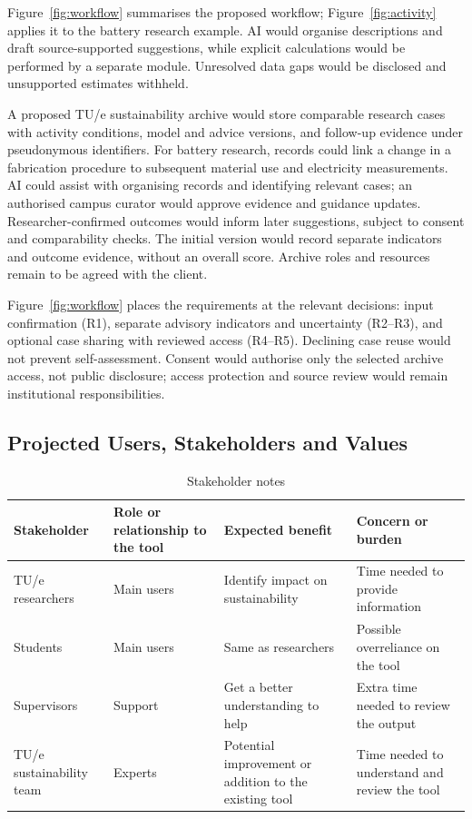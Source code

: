 \documentclass[11pt,a4paper]{article}
\begin{document}
Figure~\ref{fig:workflow} summarises the proposed workflow; Figure~\ref{fig:activity} applies it to the battery research example. AI would organise descriptions and draft source-supported suggestions, while explicit calculations would be performed by a separate module. Unresolved data gaps would be disclosed and unsupported estimates withheld.

A proposed TU/e sustainability archive would store comparable research cases with activity conditions, model and advice versions, and follow-up evidence under pseudonymous identifiers. For battery research, records could link a change in a fabrication procedure to subsequent material use and electricity measurements. AI could assist with organising records and identifying relevant cases; an authorised campus curator would approve evidence and guidance updates. Researcher-confirmed outcomes would inform later suggestions, subject to consent and comparability checks. The initial version would record separate indicators and outcome evidence, without an overall score. Archive roles and resources remain to be agreed with the client.

Figure~\ref{fig:workflow} places the requirements at the relevant decisions: input confirmation (R1), separate advisory indicators and uncertainty (R2--R3), and optional case sharing with reviewed access (R4--R5). Declining case reuse would not prevent self-assessment. Consent would authorise only the selected archive access, not public disclosure; access protection and source review would remain institutional responsibilities.




\FloatBarrier
\subsection{Projected Users, Stakeholders and Values}
\begin{table}[ht]
\centering
\begin{tabularx}{\textwidth}{|X|X|X|X|}
\hline
\textbf{Stakeholder} & \textbf{Role or relationship to the tool} & 
\textbf{Expected benefit} & \textbf{Concern or burden} \\
\hline

TU/e researchers &
Main users &
Identify impact on sustainability &
Time needed to provide information \\
\hline

Students &
Main users &
Same as researchers &
Possible overreliance on the tool \\
\hline

Supervisors &
Support &
Get a better understanding to help &
Extra time needed to review the output 
\\
\hline

TU/e sustainability team &
Experts &
Potential improvement or addition to the existing tool &
Time needed to understand and review the tool \\
\hline

\end{tabularx}
\caption{Stakeholder notes}
\label{tab:stakeholders}
\end{table}
\end{document}
